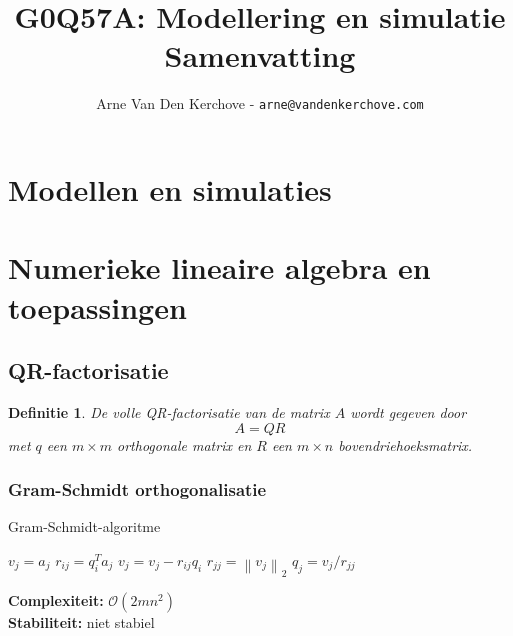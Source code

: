 \documentclass{article}
\title{
	G0Q57A: Modellering en simulatie\\
	Samenvatting
}
\author{Arne Van Den Kerchove - \texttt{arne@vandenkerchove.com}}
\newtheorem{mydef}{Definitie}
\newcommand{\norm}[1]{\left\lVert#1\right\rVert}
\begin{document}
	\maketitle
	
	\pagebreak
	
	\tableofcontents
	
	\pagebreak	
	
	
	\section{Modellen en simulaties}
	
	
	
	
	\section{Numerieke lineaire algebra en toepassingen}
	
	\subsection{QR-factorisatie}
	
	
	\begin{mydef}
		De volle QR-factorisatie van de matrix $A$ wordt gegeven door
		$$	A=QR  $$
		met $q$ een $m \times m$ orthogonale matrix en $R$ een $m \times n $ bovendriehoeksmatrix.
	\end{mydef}

	\subsubsection{Gram-Schmidt orthogonalisatie}
	

	\begin{algorithm}[!ht]
		\caption{Gram-Schmidt-algoritme}
		\begin{algorithmic}[1]
					\State $v_j = a_j$
						\State $r_{ij} = q_i^T a_j$
						\State $v_j = v_j - r_{ij} q_i$
					\EndFor
					\State $r_{jj} = \norm{v_j}_2$
					\State $q_j = v_j/r_{jj}$
				\EndFor 
			\EndProcedure
		\end{algorithmic}
	\end{algorithm}

	\textbf{Complexiteit:} $\mathcal{O}(2mn^2)$\\
	\textbf{Stabiliteit:} niet stabiel
	
\end{document}

